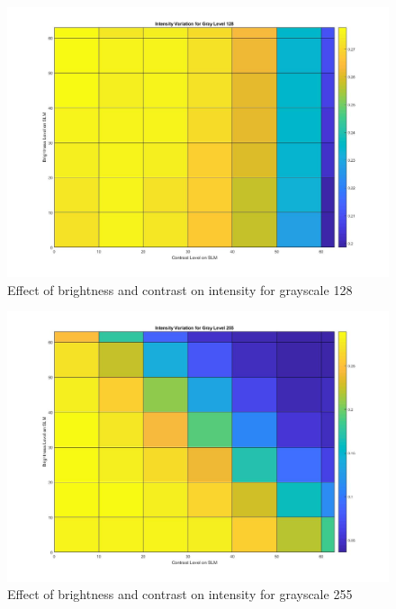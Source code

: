 \begin{figure}[h]
\centering
\includegraphics[width = \linewidth]{pics/slm/slmgrayscale128.jpg}
\caption{Effect of brightness and contrast on intensity for grayscale 128}
\label{fig:slm_grayscale128}
\end{figure}

\begin{figure}[htbp]
\centering
\includegraphics[width = \linewidth]{pics/slm/slmgrayscale255.jpg}
\caption{Effect of brightness and contrast on intensity for grayscale 255}
\label{fig:slm_grayscale255}
\end{figure}

